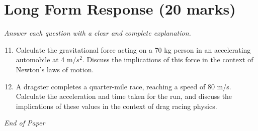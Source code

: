\documentclass[12pt]{article}
\begin{document}
\section*{Long Form Response (20 marks)}
\textit{Answer each question with a clear and complete explanation.}
\begin{enumerate}[label=\arabic*.]
\setcounter{enumi}{10}
\item Calculate the gravitational force acting on a 70 kg person in an accelerating automobile at 4 m/$s^2$. Discuss the implications of this force in the context of Newton's laws of motion.
\item A dragster completes a quarter-mile race, reaching a speed of 80 m/s. Calculate the acceleration and time taken for the run, and discuss the implications of these values in the context of drag racing physics.
\end{enumerate}

\vfill
\noindent\textit{End of Paper}
\end{document}
